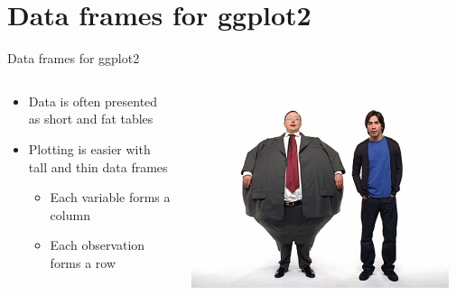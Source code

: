 \documentclass[aspectratio=169]{beamer}\usepackage[]{graphicx}\usepackage[]{color}
\begin{document}
\section{Data frames for ggplot2}
\begin{frame}[fragile]{Data frames for ggplot2}
\begin{columns}
  \begin{column}{0.50\textwidth}
    \begin{itemize}
      \item Data is often presented as short and fat tables
      \item Plotting is easier with tall and thin data frames
      \begin{itemize}
        \item Each variable forms a column
        \item Each observation forms a row
      \end{itemize}
    \end{itemize}
  \end{column}
	\begin{column}{0.5\textwidth}
  \begin{center}
      \includegraphics[width=0.95\textwidth]{./images/fat_vs_thin.png}
  \end{center}
  \end{column}
\end{columns}
\end{frame}
\end{document}
